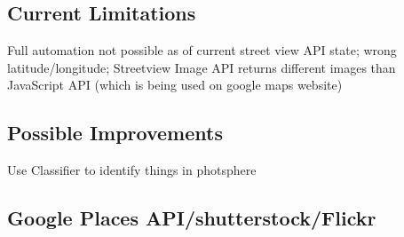 \subsection{Current Limitations}
Full automation not possible as of current street view API state; wrong latitude/longitude; Streetview Image API returns different images than JavaScript API (which is being used on google maps website)

\subsection{Possible Improvements}
Use Classifier to identify things in photsphere

\subsection{Google Places API/shutterstock/Flickr}